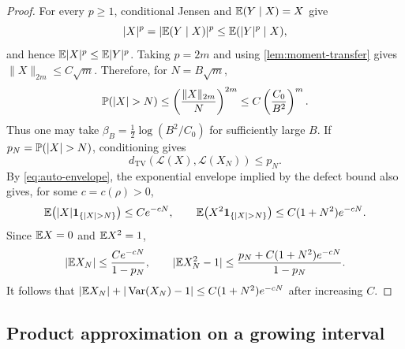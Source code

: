 \begin{proof}
For every $p\ge1$, conditional Jensen and $\mathbb E(Y\mid X)=X$ give
\[
|X|^p=|\mathbb E(Y\mid X)|^p\le \mathbb E(|Y|^p\mid X),
\]
and hence $\mathbb E|X|^p\le\mathbb E|Y|^p$. Taking $p=2m$ and using \cref{lem:moment-transfer} gives $\|X\|_{2m}\le C\sqrt m$. Therefore, for $N=B\sqrt m$,
\[
\Pp(|X|>N)
\le \left(\frac{\|X\|_{2m}}{N}\right)^{2m}
\le C\left(\frac{C_0}{B^2}\right)^m.
\]
Thus one may take $\beta_B=\frac12\log(B^2/C_0)$ for sufficiently large $B$. If $p_N=\Pp(|X|>N)$, conditioning gives
\[
d_{\mathrm{TV}}(\mathcal L(X),\mathcal L(X_N))\le p_N.
\]
By \eqref{eq:auto-envelope}, the exponential envelope implied by the defect bound also gives, for some $c=c(\rho)>0$,
\[
\E\bigl(|X|\mathbf1_{\{|X|>N\}}\bigr)\le Ce^{-cN},
\qquad
\E\bigl(X^2\mathbf1_{\{|X|>N\}}\bigr)\le C(1+N^2)e^{-cN}.
\]
Since $\mathbb E X=0$ and $\mathbb E X^2=1$,
\[
|\mathbb E X_N|\le\frac{Ce^{-cN}}{1-p_N},
\qquad
|\mathbb E X_N^2-1|\le\frac{p_N+C(1+N^2)e^{-cN}}{1-p_N}.
\]
It follows that $|\mathbb E X_N|+|\operatorname{Var}(X_N)-1|\le C(1+N^2)e^{-cN}$ after increasing $C$.
\end{proof}

\subsection{Product approximation on a growing interval}


